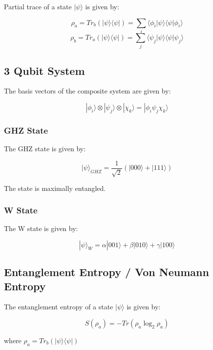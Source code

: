 \documentclass[
  letterpaper,
  DIV=11,
  numbers=noendperiod]{scrreprt}
\begin{document}
Partial trace of a state \(|\psi\rangle\) is given by:

\[ \rho_a = Tr_b(|\psi\rangle \langle \psi|) = \sum_{i} \langle \phi_i | \psi \rangle \langle \psi | \phi_i \rangle \]
\[ \rho_b = Tr_a(|\psi\rangle \langle \psi|) = \sum_{j} \langle \psi_j | \psi \rangle \langle \psi | \psi_j \rangle \]

\subsection*{3 Qubit System}\label{qubit-system}

The basis vectors of the composite system are given by:

\[|\phi_i\rangle \otimes |\psi_j\rangle \otimes |\chi_k\rangle = |\phi_i\psi_j\chi_k\rangle\]

\subsubsection*{GHZ State}\label{ghz-state}

The GHZ state is given by:

\[ |\psi\rangle_{GHZ} = \frac{1}{\sqrt{2}} (|000\rangle + |111\rangle) \]

The state is maximally entangled.

\subsubsection*{W State}\label{w-state}

The W state is given by:

\[ |\psi\rangle_{W} = \alpha |001\rangle + \beta |010\rangle + \gamma |100\rangle \]

\subsection*{Entanglement Entropy / Von Neumann
Entropy}\label{entanglement-entropy-von-neumann-entropy}

The entanglement entropy of a state \(|\psi\rangle\) is given by:

\[ S(\rho_a) = -Tr(\rho_a \log_2 \rho_a) \]

where \(\rho_a = Tr_b(|\psi\rangle \langle \psi|)\)
\end{document}
